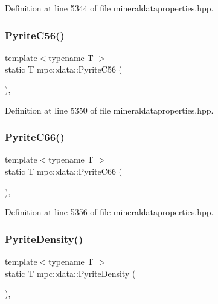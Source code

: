 Definition at line 5344 of file mineraldataproperties.\+hpp.

\mbox{\label{namespacempc_1_1data_a768175a46d8188c1d8f998db8ed3c1d6}} 
\subsubsection{\texorpdfstring{Pyrite\+C56()}{PyriteC56()}}
{\footnotesize\ttfamily template$<$typename T $>$ \\
static T mpc\+::data\+::\+Pyrite\+C56 (\begin{DoxyParamCaption}{ }\end{DoxyParamCaption})\hspace{0.3cm}{\ttfamily [inline]}, {\ttfamily [static]}}



Definition at line 5350 of file mineraldataproperties.\+hpp.

\mbox{\label{namespacempc_1_1data_a42543c2f733d47807d60d92fb18bfab3}} 
\subsubsection{\texorpdfstring{Pyrite\+C66()}{PyriteC66()}}
{\footnotesize\ttfamily template$<$typename T $>$ \\
static T mpc\+::data\+::\+Pyrite\+C66 (\begin{DoxyParamCaption}{ }\end{DoxyParamCaption})\hspace{0.3cm}{\ttfamily [inline]}, {\ttfamily [static]}}



Definition at line 5356 of file mineraldataproperties.\+hpp.

\mbox{\label{namespacempc_1_1data_aa084718e0e088b08ef4446f166f2baf3}} 
\subsubsection{\texorpdfstring{Pyrite\+Density()}{PyriteDensity()}}
{\footnotesize\ttfamily template$<$typename T $>$ \\
static T mpc\+::data\+::\+Pyrite\+Density (\begin{DoxyParamCaption}{ }\end{DoxyParamCaption})\hspace{0.3cm}{\ttfamily [inline]}, {\ttfamily [static]}}



